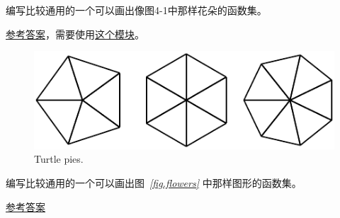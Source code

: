 \begin{exercise}


编写比较通用的一个可以画出像图4-1中那样花朵的函数集。


\href{http://thinkpython2.com/code/flower.py}{参考答案}，需要使用\href{http://thinkpython2.com/code/polygon.py}{这个模块}。

\end{exercise}



\begin{figure}
\centerline
{\includegraphics[scale=0.99]{../source/figs/pies.pdf}}
\caption{Turtle pies.}
\label{fig.pies}
\end{figure}


\begin{exercise}


编写比较通用的一个可以画出图~{\em \ref{fig.flowers} }中那样图形的函数集。


\href{http://thinkpython2.com/code/pie.py}{参考答案}

\end{exercise}


